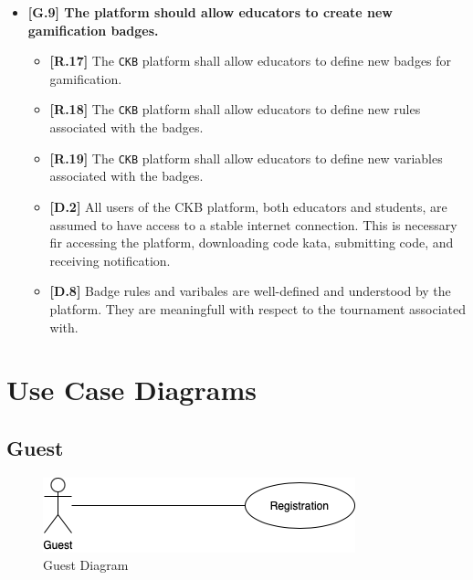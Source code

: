 \begin{itemize}
        \item \textbf{{[G.9]} The platform should allow educators to create new gamification badges.}
        \begin{itemize}
            \item \textbf{[R.17]} The \verb|CKB| platform shall allow educators to define new badges for gamification. 
            \item \textbf{[R.18]} The \verb|CKB| platform shall allow educators to define new rules associated with the badges.
            \item \textbf{[R.19]} The \verb|CKB| platform shall allow educators to define new variables associated with the badges.
            \item \textbf{[D.2]} All users of the CKB platform, both educators and students, are assumed to have access to a stable internet connection. This is
            necessary fir accessing the platform, downloading code kata, submitting code, and receiving notification.
            \item \textbf{[D.8]} Badge rules and varibales are well-defined and understood by the platform. They are meaningfull with respect to the tournament associated with.
        \end{itemize}
    \end{itemize}
\section{Use Case Diagrams}
\label{subsec:use_cases}
\subsection{Guest}
\label{subsec: use_case_diagrams}%
\begin{figure}[H]
    \begin{center}
        \includegraphics[width=0.6\linewidth]{Images/UCD_Registration.png}
        \caption{Guest Diagram}
        \label{fig:class_diagram}%
    \end{center}
\end{figure}

